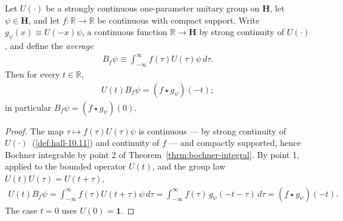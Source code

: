 \begin{lemma}
    \label{lmm:averaging-translate}
    \leanok
    Let $U(\cdot)$ be a strongly continuous one-parameter unitary group on $\mathbf{H}$, let $\psi \in \mathbf{H}$, and let $f : \mathbb{R} \rightarrow \mathbb{R}$ be continuous with compact support. Write $g_\psi(x) \equiv U(-x)\psi$, a continuous function $\mathbb{R} \rightarrow \mathbf{H}$ by strong continuity of $U(\cdot)$, and define the \textit{average}
    \begin{align}
        B_f\psi \equiv \int_{-\infty}^{\infty} f(\tau)U(\tau)\psi \, d\tau.
    \end{align}
    Then for every $t \in \mathbb{R}$,
    \begin{align}
        U(t)B_f\psi = (f \star g_\psi)(-t);
    \end{align}
    in particular $B_f\psi = (f \star g_\psi)(0)$.
\end{lemma}
\begin{proof}
    \leanok
The map $\tau \mapsto f(\tau)U(\tau)\psi$ is continuous — by strong continuity of $U(\cdot)$~(\ref{def:hall-10.11}) and continuity of $f$ — and compactly supported, hence Bochner integrable by point 2 of Theorem~\ref{thrm:bochner-integral}. By point 1, applied to the bounded operator $U(t)$, and the group law $U(t)U(\tau) = U(t+\tau)$,
\begin{align}
    U(t)B_f\psi = \int_{-\infty}^{\infty} f(\tau)U(t+\tau)\psi \, d\tau = \int_{-\infty}^{\infty} f(\tau)\, g_\psi(-t-\tau) \, d\tau = (f \star g_\psi)(-t).
\end{align}
The case $t = 0$ uses $U(0) = \mathbf{1}$.
\end{proof}

